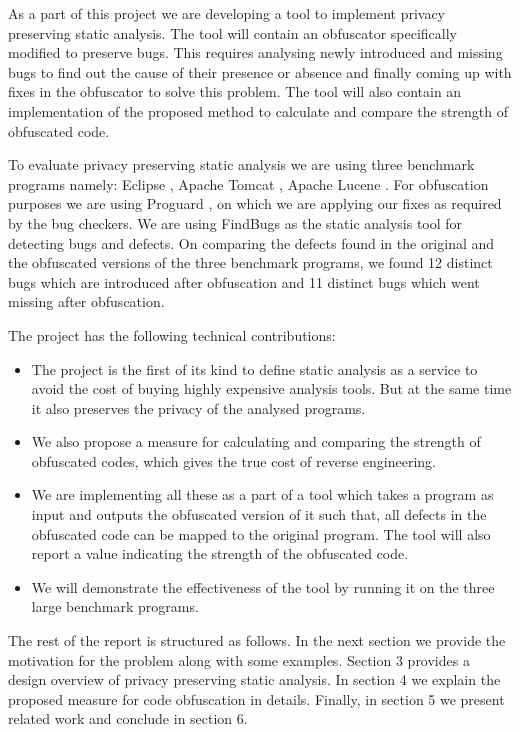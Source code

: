 \documentclass[conference]{IEEEtran}
\begin{document}
As a part of this project we are developing a tool to implement privacy preserving static analysis. The tool will contain an obfuscator specifically modified to preserve bugs. This 
requires analysing newly introduced and missing bugs to find out the cause of their presence or absence and finally coming up with fixes in the obfuscator to solve this problem. The 
tool will also contain an implementation of the proposed method to calculate and compare the strength of obfuscated code.

To evaluate privacy preserving static analysis we are using three benchmark programs namely: Eclipse \cite{eclipse}, Apache Tomcat \cite{tomcat}, Apache Lucene \cite{lucene}. For 
obfuscation purposes we are using Proguard \cite{proguard}, on which we are applying our fixes as required by the bug checkers. We are using FindBugs \cite{findbugs} as the static 
analysis tool for detecting bugs and defects. On comparing the defects found in the original and the obfuscated versions of the three benchmark programs, we found 12 distinct bugs 
which are introduced after obfuscation and 11 distinct bugs which went missing after obfuscation.

The project has the following technical contributions:
\begin{itemize}
	\item The project is the first of its kind to define static analysis as a service to avoid the cost of buying highly expensive analysis tools. But at the same time it also 
	preserves the privacy of the analysed programs.
	\item We also propose a measure for calculating and comparing the strength of obfuscated codes, which gives the true cost of reverse engineering.
	\item We are implementing all these as a part of a tool which takes a program  as input and outputs the obfuscated version of it such that, all defects in the obfuscated code 
	can be mapped to the original program. The tool will also report a value indicating the strength of the obfuscated code.
	\item We will demonstrate the effectiveness of the tool by running it on the three large benchmark programs.
\end{itemize}

The rest of the report is structured as follows. In the next section we provide the motivation for the problem along with some examples. Section 3 provides a design overview of privacy 
preserving static analysis. In section 4 we explain the proposed measure for code obfuscation in details. Finally, in section 5 we present related work and conclude in section 6.
\end{document}
